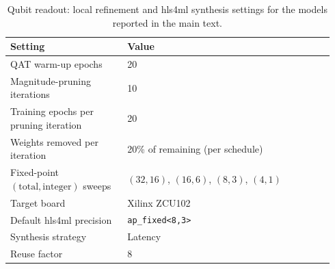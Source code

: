 \documentclass[11pt]{article}
\begin{document}
\begin{table}[t]
  \centering
  \footnotesize
  \caption{Qubit readout: local refinement and hls4ml synthesis settings for the models reported in the main text.}
  \label{tab:qubit-local-search-table}
  \begin{tabular}{@{}p{0.34\linewidth}p{0.60\linewidth}@{}}
    \toprule
    \textbf{Setting} & \textbf{Value} \\
    \midrule
    QAT warm-up epochs & 20 \\
    Magnitude-pruning iterations & 10 \\
    Training epochs per pruning iteration & 20 \\
    Weights removed per iteration & 20\% of remaining (per schedule) \\
    Fixed-point $(\mathrm{total}, \mathrm{integer})$ sweeps & $(32,16)$, $(16,6)$, $(8,3)$, $(4,1)$ \\
    Target board & Xilinx ZCU102 \\
    Default hls4ml precision & \texttt{ap\_fixed<8,3>} \\
    Synthesis strategy & Latency \\
    Reuse factor & 8 \\
    \bottomrule
  \end{tabular}
\end{table}

\clearpage

\end{document}
